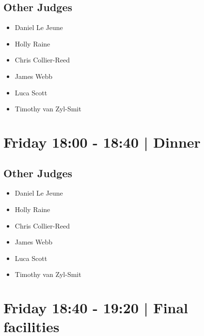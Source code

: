 \documentclass[10pt]{article}
\begin{document}
                
        \subsection*{Other Judges}
        
            \begin{itemize}
                            \item Daniel Le Jeune
                            \item Holly Raine
                            \item Chris Collier-Reed
                            \item James Webb
                            \item Luca Scott
                            \item Timothy van Zyl-Smit
                        \end{itemize}
        

            \section*{Friday 18:00
        -
        18:40
        |
         Dinner }
        
                
        \subsection*{Other Judges}
        
            \begin{itemize}
                            \item Daniel Le Jeune
                            \item Holly Raine
                            \item Chris Collier-Reed
                            \item James Webb
                            \item Luca Scott
                            \item Timothy van Zyl-Smit
                        \end{itemize}
        

            \section*{Friday 18:40
        -
        19:20
        |
         Final facilities}
        
                
\end{document}
